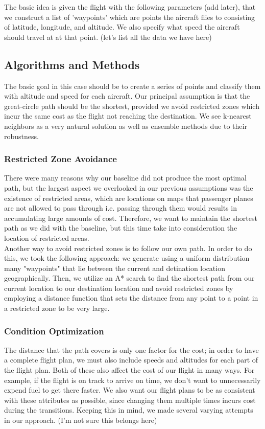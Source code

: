 \documentclass{article}[12pt]
\begin{document}
\begin{multicols}{2}
The basic idea is given the flight with the following parameters (add later), that we construct a list of 'waypoints' which are points the aircraft flies to consisting of latitude, longitude, and altitude. We also specify what speed the aircraft should travel at at that point.
(let's list all the data we have here)

\subsection{Algorithms and Methods}

The basic goal in this case should be to create a series of points and classify them with altitude and speed for each aircraft. Our principal assumption is that the great-circle path should be the shortest, provided we avoid restricted zones which incur the same cost as the flight not reaching the destination. We see k-nearest neighbors as a very natural solution as well as ensemble methods due to their robustness.

\subsubsection{Restricted Zone Avoidance}

There were many reasons why our baseline did not produce the most optimal path, but the largest aspect we overlooked in our previous assumptions was the existence of restricted areas, which are locations on maps that passenger planes are not allowed to pass through i.e. passing through them would results in accumulating large amounts of cost. Therefore, we want to maintain the shortest path as we did with the baseline, but this time take into consideration the location of restricted areas.\\

Another way to avoid restricted zones is to follow our own path. In order to do this, we took the following approach: we generate using a uniform distribution many "waypoints" that lie between the current and detination location geographically. Then, we utilize an A* search to find the shortest path from our current location to our destination location and avoid restricted zones by employing a distance function that sets the distance from any point to a point in a restricted zone to be very large.

\subsubsection{Condition Optimization}
The distance that the path covers is only one factor for the cost; in order to have a complete flight plan, we must also include speeds and altitudes for each part of the flight plan. Both of these also affect the cost of our flight in many ways. For example, if the flight is on track to arrive on time, we don't want to unnecessarily expend fuel to get there faster. We also want our flight plans to be as consistent with these attributes as possible, since changing them multiple times incurs cost during the transitions. Keeping this in mind, we made several varying attempts in our approach. (I'm not sure this belongs here)


\end{multicols}
\end{document}
